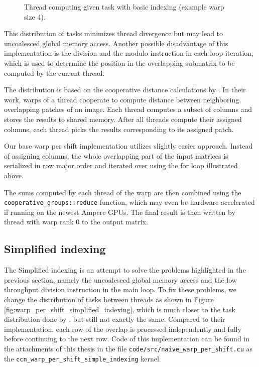 \begin{figure}[ht]
	\centering
	\def\svgwidth{0.5\textwidth}
	\fontsize{8}{10}\selectfont
	
	\caption{Thread computing given task with basic indexing (example warp size 4).}
	\label{fig:warp_per_shift_normal_indexing}
\end{figure}

This distribution of tasks minimizes thread divergence but may lead to uncoalesced global memory access. Another possible disadvantage of this implementation is the division and the modulo instruction in each loop iteration, which is used to determine the position in the overlapping submatrix to be computed by the current thread.

The distribution is based on the cooperative distance calculations by \citet{paper:krulis_3d_block}. In their work, warps of a thread cooperate to compute distance between neighboring overlapping patches of an image. Each thread computes a subset of columns and stores the results to shared memory. After all threads compute their assigned columns, each thread picks the results corresponding to its assigned patch. 

Our base warp per shift implementation utilizes slightly easier approach. Instead of assigning columns, the whole overlapping part of the input matrices is serialized in row major order and iterated over using the for loop illustrated above. 

The sums computed by each thread of the warp are then combined using the \texttt{cooperative\_groups::reduce} function, which may even be hardware accelerated if running on the newest Ampere GPUs. The final result is then written by thread with warp rank $0$ to the output matrix. 


\subsection{Simplified indexing}
\label{sec:simplified_indexing}

The Simplified indexing is an attempt to solve the problems highlighted in the previous section, namely the uncoalesced global memory access and the low throughput division instruction in the main loop. To fix these problems, we change the distribution of tasks between threads as shown in Figure \ref{fig:warp_per_shift_simplified_indexing}, which is much closer to the task distribution done by \citet{paper:krulis_3d_block}, but still not exactly the same. Compared to their implementation, each row of the overlap is processed independently and fully before continuing to the next row. Code of this implementation can be found in the attachments of this thesis in the file \texttt{code/src/naive\_warp\_per\_shift.cu} as the \texttt{ccn\_warp\_per\_shift\_simple\_indexing} kernel.

